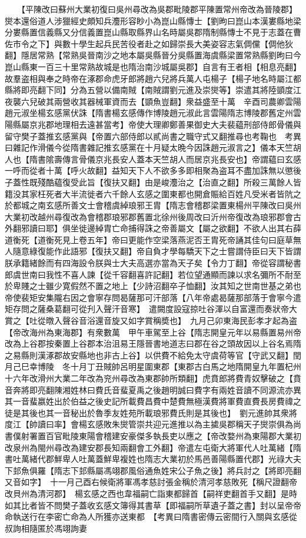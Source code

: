 　　【平陳改曰蘇州大業初復曰吳州尋改為吳郡毗陵郡平陳置常州帝改為晉陵郡】爕本還俗道人涉獵經史頗知兵灋形容眇小為崑山縣慱士【劉昫曰崑山本漢婁縣地梁分婁縣置信義縣又分信義置崑山縣取縣界山名時屬吳郡隋制縣慱士不見于志蓋在曹佐市令之下】與數十學生起兵民苦役者赴之如歸崇長大美姿容志氣倜儻【倜他狄翻】隱居常熟【常熟吳晉南沙之地本屬吳縣晉分吳縣置海虞縣梁置常熟縣劉昫曰今崑山縣東一百三十里常熟故城是也隋治南沙城屬吳郡】自言有王者相【相息亮翻】故羣盗相與奉之時帝在涿郡命虎牙郎將趙六兒將兵萬人屯楊子【楊子地名時屬江都縣將即亮翻下同】分為五營以備南賊【南賊謂劉元進及崇爕等】崇遣其將陸顗度江夜襲六兒破其兩營收其器械軍資而去【顗魚豈翻】衆益盛至十萬　辛酉司農卿雲陽趙元淑坐楊玄感黨伏誅【隋書楊玄感傳作博陵趙元淑此言雲陽隋志博陵郡舊定州雲陽縣屬京兆郡地理相去遠甚當考】帝使大理卿鄭善果御史大夫裴藴刑部侍郎骨儀與留守樊子蓋推玄感黨與【帝置六部侍郎以貳尚書之職守式又翻推尋也考鞠也　考異曰雜記作滑儀今從隋書雜記推玄感黨在十月疑太晩今因誅趙元淑言之】儀本天竺胡人也【隋書隂壽傳言骨儀京兆長安人蓋本天竺胡人而居京兆長安也】帝謂藴曰玄感一呼而從者十萬【呼火故翻】益知天下人不欲多多即相聚為盗耳不盡加誅無以懲後子蓋性既殘酷藴復受此旨【復扶又翻】由是峻灋治之【治直之翻】所殺三萬餘人皆籍没其家枉死者大半流徙者六千餘人玄感之圍東都也開倉賑給百姓凡受米者皆阬之於都城之南玄感所善文士會稽虞綽琅邪王胄【隋志會稽郡梁置東楊州平陳改曰吳州大業初改越州尋復改為會稽郡琅邪郡舊置北徐州後周改曰沂州帝復改為琅邪郡會古外翻邪讀曰耶】俱坐徙邊綽胄亡命捕得誅之帝善屬文【屬之欲翻】不欲人出其右薛道衡死【道衡死見上卷五年】帝曰更能作空梁落燕泥否王胄死帝誦其佳句曰庭草無人隨意綠復能作此語邪【復扶又翻】帝自負才學每驕天下之士嘗謂侍臣曰天下皆謂朕承籍緒餘而有四海設令朕與士大夫高選亦當為天子矣【令力丁翻】帝從容謂秘書郎虞世南曰我性不喜人諫【從千容翻喜許記翻】若位望通顯而諫以求名彌所不耐至於卑賤之士雖少寛假然不置之地上【少詩沼翻卒子恤翻】汝其知之世南世基之弟也　帝使裴矩安集隴右因之會寧存問曷薩那可汗部落【八年帝處曷薩那部落于會寧今遣矩存問之薩桑葛翻可從刋入聲汗音寒】　遣闕度設寇掠吐谷渾以自富還而奏狀帝大賞之【吐從暾入聲谷音浴還音旋又如字賞稱奬也】　九月己卯東海民彭孝才起為盗【帝改海州為東海郡】有衆數萬　甲午車駕至上谷【隋志開皇元年以易縣置易州帝改為上谷郡按秦置上谷郡本治沮易王隱晉書地道志曰郡在谷之頭故因以上谷名焉隋之易縣則漢涿郡故安縣地也非古上谷】以供費不給免太守虞荷等官【守武又翻】閏月己巳幸博陵　冬十月丁丑賊帥呂明星圍東郡【東郡古白馬之地隋開皇九年置杞州十六年改滑州大業二年改為兖州尋改為東郡帥所類翻】虎賁郎將費青奴擊破之【賁音奔將即亮翻陳湘姓林曰費氏音蜚夏禹之後趙明誠曰費字有兩姓音讀不同源流亦異其一音蜚嬴姓出於伯益之後史記所載費昌費中楚費無極漢費將軍費直費長房費禕之徒是其後也其一音秘出於魯季友姓苑所載琅邪費氏則是其後也】　劉元進帥其衆將度江【帥讀曰率】會楊玄感敗朱爕管崇共迎元進推以為主㨿吳郡稱天子爕崇俱為尚書僕射署置百官毗陵東陽會稽建安豪傑多執長吏以應之【帝改婺州為東陽郡大業初改泉州為閩州尋改為建安郡長知兩翻會工外翻】帝遣左屯衛大將軍代人吐萬緒【隋書吐萬緒代郡鮮卑人吐萬蓋鮮卑複姓也隋志大業初於馬邑善陽縣置代郡】光祿大夫下邽魚俱羅【隋志下邽縣屬馮翊郡風俗通魚姓宋公子魚之後】將兵討之【將即亮翻又音如字】　十一月己酉右候衛將軍馮孝慈討張金稱於清河孝慈敗死【稱尺證翻帝改貝州為清河郡】　楊玄感之西也韋福嗣亡詣東都歸首【嗣祥吏翻首手又翻】是時如其比者皆不問樊子蓋收玄感文簿得其書草【即福嗣所草遺子蓋之書】封以呈帝帝命執送行在李密亡命為人所獲亦送東都　【考異曰隋書密傳云密間行入關與玄感從叔詢相隨匿於馮翊詢妻